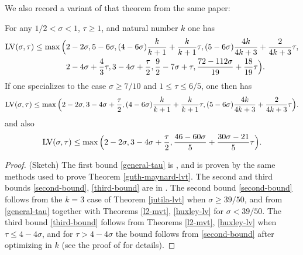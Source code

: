 We also record a variant of that theorem from the same paper:

\begin{theorem}\label{guth-maynard-extra} For any $1/2 < \sigma < 1$, $\tau \geq 1$, and natural number $k$ one has
    \begin{equation}\label{general-tau}
    \begin{split}
        \mathrm{LV}(\sigma,\tau) \leq \max\Big(&2-2\sigma, 5-6\sigma, (4-6\sigma)\frac{k}{k+1} + \frac{k}{k+1} \tau, (5-6\sigma) \frac{4k}{4k+3} + \frac{2}{4k+3} \tau, \\
        &2-4\sigma + \frac{4}{3} \tau, 3-4\sigma+ \frac{\tau}{2}, \frac{9}{2}-7\sigma+\tau, \frac{72-112\sigma}{19} + \frac{18}{19} \tau\Big).
    \end{split}
    \end{equation}
If one specializes to the case $\sigma \geq 7/10$ and $1 \leq \tau \leq 6/5$, one then has
    \begin{equation}\label{second-bound} \mathrm{LV}(\sigma,\tau) \leq \max\Big(2-2\sigma, 3-4\sigma+\frac{\tau}{2}, (4-6\sigma)\frac{k}{k+1} + \frac{k}{k+1} \tau, (5-6\sigma) \frac{4k}{4k+3} + \frac{2}{4k+3} \tau\Big).
    \end{equation}
and also
\begin{equation}\label{third-bound}
     \mathrm{LV}(\sigma,\tau) \leq \max\Big(2-2\sigma, 3-4\sigma+\frac{\tau}{2}, \frac{46-60\sigma}{5} + \frac{30\sigma-21}{5} \tau\Big).
\end{equation}
\end{theorem}

\literature
{}
\derived
{}

\begin{proof}
(Sketch) The first bound \eqref{general-tau} is \cite[(12.1)]{guth-maynard}, and is proven by the same methods used to prove Theorem \ref{guth-maynard-lvt}.  The second and third bounds \eqref{second-bound}, \eqref{third-bound} are in \cite[Proposition 12.1]{guth-maynard}.  The second bound \eqref{second-bound} follows from the $k=3$ case of Theorem \ref{jutila-lvt} when $\sigma \geq 39/50$, and from \eqref{general-tau} together with Theorems \ref{l2-mvt}, \ref{huxley-lv} for $\sigma < 39/50$.  The third bound \eqref{third-bound} follows from Theorems \ref{l2-mvt}, \ref{huxley-lv} when $\tau \leq 4-4\sigma$, and for $\tau > 4-4\sigma$
the bound follows from \eqref{second-bound} after optimizing in $k$ (see the proof of \cite[Proposition 12.1]{guth-maynard} for details).
\end{proof}

